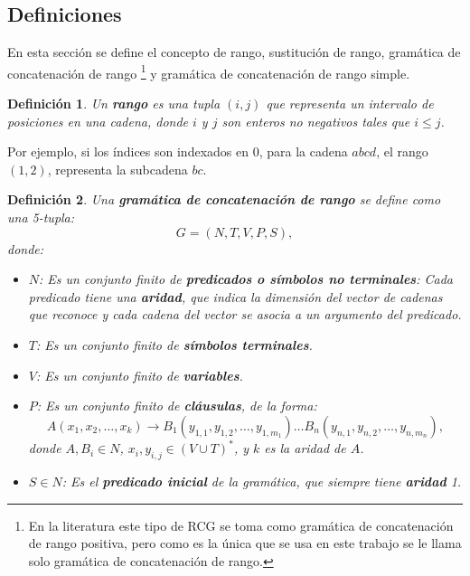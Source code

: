 \documentclass{article}
\newtheorem{definition}{Definición}
\begin{document}
\subsection{Definiciones}

En esta sección se define el concepto de rango, sustitución de rango, gramática de concatenación de rango \footnote{En la literatura este tipo de RCG se toma como gramática de concatenación de rango positiva, pero como es la única que
    se usa en este trabajo se le llama solo gramática de concatenación de rango.} y gramática de concatenación de rango simple.

\begin{definition}
    Un \textbf{rango} es una tupla $(i, j)$ que representa un intervalo de posiciones en una cadena, donde $i$ y $j$ son enteros no negativos tales que $i \leq j$.
\end{definition}

Por ejemplo, si los índices son indexados en 0, para la cadena $abcd$, el rango $(1,2)$, representa la subcadena $bc$.

\begin{definition}
    Una \textbf{gramática de concatenación de rango} se define como una 5-tupla:
    \[
        G = (N, T, V, P, S),
    \]
    donde:

    \begin{itemize}
        \item $N$: Es un conjunto finito de \textbf{predicados o símbolos no terminales}: Cada predicado tiene una \textbf{aridad}, que indica la dimensión del vector de cadenas que reconoce y cada cadena del vector se asocia a un argumento del predicado.
        \item $T$: Es un conjunto finito de \textbf{símbolos terminales}.
        \item $V$: Es un conjunto finito de \textbf{variables}.
        \item $P$: Es un conjunto finito de \textbf{cláusulas}, de la forma:
              \[
                  A(x_1, x_2, \ldots, x_k) \to B_1(y_{1,1}, y_{1,2}, \ldots, y_{1,m_1}) \ldots B_n(y_{n,1}, y_{n,2}, \ldots, y_{n,m_n}),
              \]
              donde $A, B_i \in N$, $x_i, y_{i,j} \in (V \cup T)^*$, y $k$ es la aridad de $A$.
        \item $S \in N$: Es el \textbf{predicado inicial} de la gramática, que siempre tiene \textbf{aridad} 1.
    \end{itemize}
\end{definition}
\end{document}
